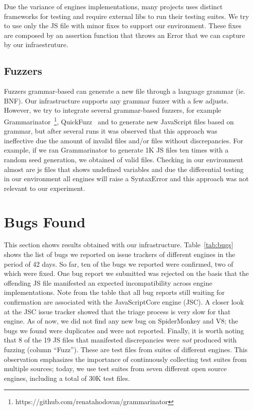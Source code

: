 \documentclass[10pt,conference,anonymous]{IEEEtran}
\begin{document}
Due the variance of engines implementations, many projects uses distinct frameworks for testing 
and require external libs to run their testing suites. We try to use only the JS file with minor fixes
to support our environment. These fixes are composed by an assertion function that throws an Error that
we can capture by our infraestruture. 

\subsection{Fuzzers}
Fuzzers grammar-based can generate a new file through a language grammar (ie. BNF).
Our infrastructure supports any grammar fuzzer with a few adjusts. However, 
we try to integrate several grammar-based fuzzers, for example 
Grammarinator~\footnote{https://github.com/renatahodovan/grammarinator}, QuickFuzz~\cite{grieco2016quickfuzz}
and  to generate new JavaScript files based on grammar, but 
after several runs it was observed that this approach was ineffective
due the amount of invalid files and/or files without discrepancies. For example, if we ran 
Grammarinator to generate 1K JS files ten times with a random seed generation, we obtained
 of valid files. Checking in our environment almost 
are js files that shows undefined variables and due the differential testing in our environment
all engines will raise a SyntaxError and this approach was not relevant to our experiment.

\section{Bugs Found}
\label{sec:bugs}


This section shows results obtained with our
infrastructure. Table~\ref{tab:bugs} shows the list of bugs we
reported on issue trackers of different engines in the period of 42
days. So far, ten of the bugs we reported
were confirmed, two of which were fixed. One bug report we
submitted was rejected on the basis that the offending JS file
manifested an expected incompatibility across engine
implementations.
Note from the table that all bug
reports still waiting for confirmation are associated with the
JavaScriptCore engine (JSC). A closer look at the JSC issue tracker
showed that the triage process is very slow for that engine. As of
now, we did not find any new bug on SpiderMonkey and V8; the bugs we
found were duplicates and were not reported. Finally, it is
worth noting that 8 of the 19 JS files that manifested
discrepancies were \emph{not} produced with fuzzing (column
``Fuzz''). These are test files from suites of different engines. This
observation emphasizes the importance of continuously collecting test suites from
multiple sources; today, we use test suites from seven different open
source engines, including a total of 30K test files.
\end{document}
